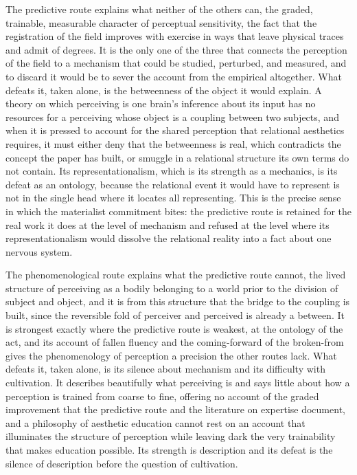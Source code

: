 The predictive route explains what neither of the others can, the graded, trainable, measurable character of perceptual sensitivity, the fact that the registration of the field improves with exercise in ways that leave physical traces and admit of degrees. It is the only one of the three that connects the perception of the field to a mechanism that could be studied, perturbed, and measured, and to discard it would be to sever the account from the empirical altogether. What defeats it, taken alone, is the betweenness of the object it would explain. A theory on which perceiving is one brain's inference about its input has no resources for a perceiving whose object is a coupling between two subjects, and when it is pressed to account for the shared perception that relational aesthetics requires, it must either deny that the betweenness is real, which contradicts the concept the paper has built, or smuggle in a relational structure its own terms do not contain. Its representationalism, which is its strength as a mechanics, is its defeat as an ontology, because the relational event it would have to represent is not in the single head where it locates all representing. This is the precise sense in which the materialist commitment bites: the predictive route is retained for the real work it does at the level of mechanism and refused at the level where its representationalism would dissolve the relational reality into a fact about one nervous system.

The phenomenological route explains what the predictive route cannot, the lived structure of perceiving as a bodily belonging to a world prior to the division of subject and object, and it is from this structure that the bridge to the coupling is built, since the reversible fold of perceiver and perceived is already a between. It is strongest exactly where the predictive route is weakest, at the ontology of the act, and its account of fallen fluency and the coming-forward of the broken-from gives the phenomenology of perception a precision the other routes lack. What defeats it, taken alone, is its silence about mechanism and its difficulty with cultivation. It describes beautifully what perceiving is and says little about how a perception is trained from coarse to fine, offering no account of the graded improvement that the predictive route and the literature on expertise document, and a philosophy of aesthetic education cannot rest on an account that illuminates the structure of perception while leaving dark the very trainability that makes education possible. Its strength is description and its defeat is the silence of description before the question of cultivation.

